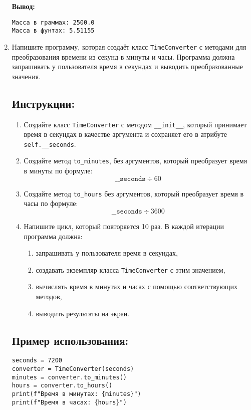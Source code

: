 \begin{enumerate}
\textbf{Вывод:}
\begin{verbatim}
Масса в граммах: 2500.0
Масса в фунтах: 5.51155
\end{verbatim}

\item 


Напишите программу, которая создаёт класс \texttt{TimeConverter} с методами для преобразования времени
из секунд в минуты и часы. Программа должна запрашивать у пользователя время в секундах
и выводить преобразованные значения.

\subsection*{Инструкции:}
\begin{enumerate}
\item Создайте класс \texttt{TimeConverter} с методом
\texttt{\_\_init\_\_}, который принимает время в секундах в
качестве аргумента и сохраняет его в атрибуте \texttt{self.\_\_seconds}.

\item Создайте метод \texttt{to\_minutes},
без аргументов, который преобразует время в минуты по формуле:
\[
\texttt{\_\_seconds} \div 60
\]

\item Создайте метод \texttt{to\_hours} без аргументов,
который преобразует время в часы по формуле:
\[
\texttt{\_\_seconds} \div 3600
\]

\item Напишите цикл, который повторяется 10 раз. В каждой итерации программа должна:
\begin{enumerate}
\item запрашивать у пользователя время в секундах,
\item создавать экземпляр класса \texttt{TimeConverter} с этим значением,
\item вычислять время в минутах и часах с помощью соответствующих методов,
\item выводить результаты на экран.
\end{enumerate}
\end{enumerate}

\subsection*{Пример использования:}
\begin{verbatim}
seconds = 7200
converter = TimeConverter(seconds)
minutes = converter.to_minutes()
hours = converter.to_hours()
print(f"Время в минутах: {minutes}")
print(f"Время в часах: {hours}")
\end{verbatim}


\end{enumerate}
